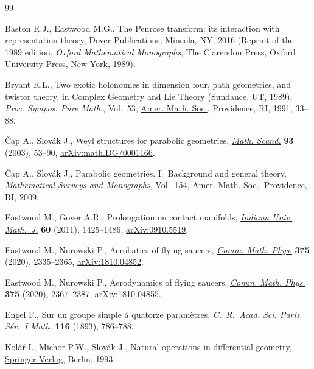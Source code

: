 \begin{thebibliography}{99}
\footnotesize\itemsep=0pt

Baston R.J., Eastwood M.G., The {P}enrose transform: its interaction with
 representation theory, Dover Publications, Mineola, NY, 2016
 (Reprint of the 1989 edition, \textit{Oxford Mathematical Monographs}, The Clarendon Press,
 Oxford University Press, New York, 1989).

Bryant R.L., Two exotic holonomies in dimension four, path geometries, and
 twistor theory, in Complex Geometry and {L}ie Theory ({S}undance, {UT},
 1989), \textit{Proc. Sympos. Pure Math.}, Vol.~53, \href{https://doi.org/10.1090/pspum/053/1141197}{Amer. Math. Soc.},
 Providence, RI, 1991, 33--88.

\v{C}ap A., Slov\'ak J., Weyl structures for parabolic geometries,
 \href{https://doi.org/10.7146/math.scand.a-14413}{\textit{Math. Scand.}} \textbf{93} (2003), 53--90, \href{https://arxiv.org/abs/math.DG/0001166}{arXiv:math.DG/0001166}.

\v{C}ap A., Slov\'ak J., Parabolic geometries. {I}.~Background and general
 theory, \textit{Mathematical Surveys and Monographs}, Vol.~154, \href{https://doi.org/10.1090/surv/154}{Amer. Math.
 Soc.}, Providence, RI, 2009.

Eastwood M., Gover A.R., Prolongation on contact manifolds, \href{https://doi.org/10.1512/iumj.2011.60.4980}{\textit{Indiana
 Univ. Math.~J.}} \textbf{60} (2011), 1425--1486, \href{https://arxiv.org/abs/0910.5519}{arXiv:0910.5519}.

Eastwood M., Nurowski P., Aerobatics of flying saucers, \href{https://doi.org/10.1007/s00220-019-03621-2}{\textit{Comm. Math.
 Phys.}} \textbf{375} (2020), 2335--2365, \href{https://arxiv.org/abs/1810.04852}{arXiv:1810.04852}.

Eastwood M., Nurowski P., Aerodynamics of flying saucers, \href{https://doi.org/10.1007/s00220-019-03622-1}{\textit{Comm. Math.
 Phys.}} \textbf{375} (2020), 2367--2387, \href{https://arxiv.org/abs/1810.04855}{arXiv:1810.04855}.

Engel F., Sur un groupe simple \'a quatorze param\`etres, \textit{C.~R.~Acad.
 Sci. Paris S\'er.~I Math.} \textbf{116} (1893), 786--788.

Kol\'a\v{r} I., Michor P.W., Slov\'ak J., Natural operations in differential
 geometry, \href{https://doi.org/10.1007/978-3-662-02950-3}{Springer-Verlag}, Berlin, 1993.


\end{thebibliography}

